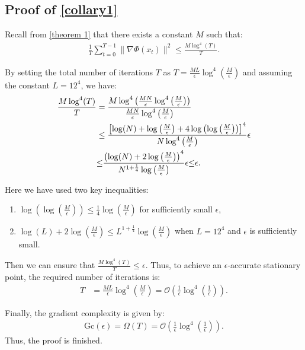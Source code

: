 \documentclass{article}
\theoremstyle{plain}
\theoremstyle{definition}
\theoremstyle{remark}
\begin{document}
\subsection{Proof of \cref{collary1}}
Recall from \cref{theorem 1} that there exists a constant \( M \) such that:
\begin{align}
    \frac{1}{T} \sum_{t=0}^{T-1} \|\nabla \Phi(x_t)\|^2 \leq \frac{M \log^4(T)}{T}.
\end{align}

By setting the total number of iterations \( T \) as $T = \frac{ML}{\epsilon} \log^4\left(\frac{M}{\epsilon}\right)$ and assuming the constant \( L = 12^4 \), we have:
\begin{align}
    \frac{M \log^4(T)}{T} 
    &= \frac{M \log^4\left(\frac{MN}{\epsilon} \log^4\left(\frac{M}{\epsilon}\right)\right)}{\frac{MN}{\epsilon} \log^4\left(\frac{M}{\epsilon}\right)} \notag \\
    &\leq \frac{\left[\log(N) + \log\left(\frac{M}{\epsilon}\right) + 4\log\left(\log\left(\frac{M}{\epsilon}\right)\right)\right]^4}{N \log^4\left(\frac{M}{\epsilon}\right)}  \epsilon \notag \\
    &{\leq} \frac{\left(\log(N) + 2\log\left(\frac{M}{\epsilon}\right)\right)^4}{N^{1 + \frac{1}{4}} \log\left(\frac{M}{\epsilon}\right)}  \epsilon 
    {\leq} \epsilon. \notag
\end{align}


Here we have used two key inequalities:
\begin{enumerate}
    \item \(\log\left(\log\left(\frac{M}{\epsilon}\right)\right) \leq \frac{1}{4} \log\left(\frac{M}{\epsilon}\right)\) for sufficiently small \(\epsilon\),
    \item \(\log(L) + 2 \log\left(\frac{M}{\epsilon}\right) \leq L^{1 + \frac{1}{4}} \log\left(\frac{M}{\epsilon}\right)\) when \(L = 12^4\) and \(\epsilon\) is sufficiently small.
\end{enumerate}
Then we can ensure that $\frac{M \log^4(T)}{T} \leq \epsilon$.
Thus, to achieve an \(\epsilon\)-accurate stationary point, the required number of iterations is:
\begin{align}
    T &= \frac{ML}{\epsilon} \log^4\left(\frac{M}{\epsilon}\right)= \mathcal{O}\left(\frac{1}{\epsilon} \log^4\left(\frac{1}{\epsilon}\right)\right).
\end{align}

Finally, the gradient complexity is given by:
\begin{align}
    \mathrm{Gc}(\epsilon)={\Omega}(T) = \mathcal{O}\left(\frac{1}{\epsilon} \log^4\left(\frac{1}{\epsilon}\right)\right).
\end{align}
Thus, the proof is finished.
\end{document}
